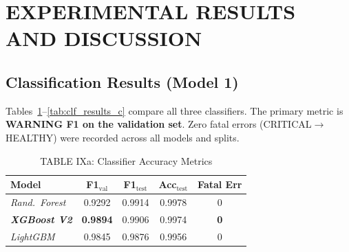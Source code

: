 \documentclass[conference]{IEEEtran}
\begin{document}

\section{EXPERIMENTAL RESULTS AND DISCUSSION}
\label{sec:results}

\subsection{Classification Results (Model 1)}

Tables~\ref{tab:clf_results_a}--\ref{tab:clf_results_c} compare all three
classifiers. The primary metric is \textbf{WARNING F1 on the validation set}.
Zero fatal errors (CRITICAL$\rightarrow$HEALTHY) were recorded across all
models and splits.

\begin{table}[htbp]
\caption{TABLE IXa: Classifier Accuracy Metrics}
\centering
\begin{tabular}{lcccc}
\hline
\textbf{Model} & \textbf{F1$_\text{val}$} & \textbf{F1$_\text{test}$} & \textbf{Acc$_\text{test}$} & \textbf{Fatal Err} \\
\hline
\textit{Rand.\ Forest}        & 0.9292          & 0.9914 & 0.9978 & 0 \\
\textbf{\textit{XGBoost V2}}  & \textbf{0.9894} & 0.9906 & 0.9974 & \textbf{0} \\
\textit{LightGBM}             & 0.9845          & 0.9876 & 0.9956 & 0 \\
\hline
\end{tabular}
\label{tab:clf_results_a}
\end{table}
\end{document}
